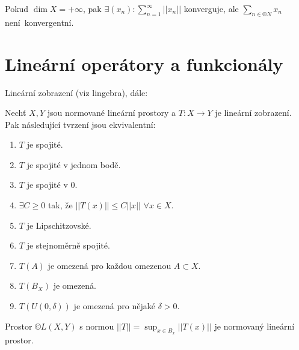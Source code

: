 \documentclass[12pt]{article}					%
\begin{document}
\begin{veta}
	Pokud $\dim X = +∞$, pak $\exists(x_n): \sum_{n=1}^∞ ||x_n||$ konverguje, ale $\sum_{n \in ®N}x_n$ není konvergentní.
\end{veta}

\section{Lineární operátory a funkcionály}
\begin{poznamka}
	Lineární zobrazení (viz lingebra), dále:
	
	\begin{veta}
		Nechť $X, Y$ jsou normované lineární prostory a $T: X \rightarrow Y$ je lineární zobrazení. Pak následující tvrzení jsou ekvivalentní:
		
		\begin{enumerate}
			\item $T$ je spojité.
			\item $T$ je spojité v jednom bodě.
			\item $T$ je spojité v 0.
			\item $\exists C ≥ 0$ tak, že $||T(x)|| ≤ C ||x||$ $\forall x \in X$.
			\item $T$ je Lipschitzovské.
			\item $T$ je stejnoměrně spojité.
			\item $T(A)$ je omezená pro každou omezenou $A \subset X$.
			\item $T(B_X)$ je omezená.
			\item $T(U(0, \delta))$ je omezená pro nějaké $\delta > 0$.
		\end{enumerate}
	\end{veta}

	Prostor $©L(X, Y)$ s normou $||T|| = \sup_{x \in B_x}||T(x)||$ je normovaný lineární prostor.
\end{poznamka}
\end{document}
